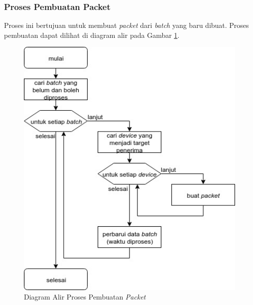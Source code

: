 \subsubsection{Proses Pembuatan Packet}
\par Proses ini bertujuan untuk membuat \textit{packet} dari \textit{batch} yang baru dibuat. Proses pembuatan dapat dilihat di diagram alir pada Gambar \ref{flowchart_pembuatan_packet}.
\begin{figure}[H]
	\centering\includegraphics[width=1\textwidth]{bab3/img/flowchart-pembuatan_packet.jpg}
	\caption{Diagram Alir Proses Pembuatan \textit{Packet}} \label{flowchart_pembuatan_packet}
\end{figure}

\clearpage
